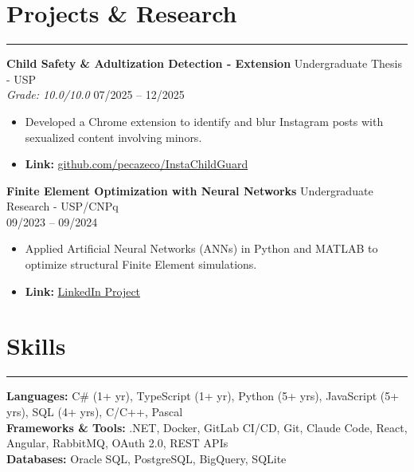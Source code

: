 \documentclass[10pt,a4paper]{article}
\begin{document}
\section*{Projects \& Research}
\hrule \vspace{2mm}
\textbf{Child Safety \& Adultization Detection - Extension} \hfill Undergraduate Thesis - USP \\
\textit{Grade: 10.0/10.0} \hfill 07/2025 -- 12/2025
\begin{itemize}[nosep]
    \item Developed a Chrome extension to identify and blur Instagram posts with sexualized content involving minors.
    \item \textbf{Link:} \href{https://github.com/pecazeco/InstaChildGuard}{github.com/pecazeco/InstaChildGuard}
\end{itemize}


\vspace{1mm}
\textbf{Finite Element Optimization with Neural Networks} \hfill Undergraduate Research - USP/CNPq \\
\textit{} \hfill 09/2023 -- 09/2024
\begin{itemize}[nosep]
    \item Applied Artificial Neural Networks (ANNs) in Python and MATLAB to optimize structural Finite Element simulations.
    \item \textbf{Link:} \href{https://www.linkedin.com/in/pecazeco/overlay/Project/1245750859/treasury/?profileId=ACoAAB0DOEEB_8QK5O0kMffFFd9R2OcO3bHhrBg}{LinkedIn Project}
\end{itemize}

\section*{Skills}
\hrule \vspace{2mm}
\textbf{Languages:} C\# (1+ yr), TypeScript (1+ yr), Python (5+ yrs), JavaScript (5+ yrs), SQL (4+ yrs), C/C++, Pascal \\
\textbf{Frameworks \& Tools:} .NET, Docker, GitLab CI/CD, Git, Claude Code, React, Angular, RabbitMQ, OAuth 2.0, REST APIs \\
\textbf{Databases:} Oracle SQL, PostgreSQL, BigQuery, SQLite
\end{document}
